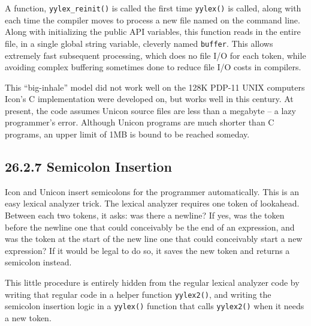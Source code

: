 A function, \texttt{yylex\_reinit()} is called the first time
\texttt{yylex()} is called, along with each time the compiler moves to
process a new file named on the command line. Along with initializing
the public API variables, this function reads in the entire file, in a
single global string variable, cleverly named \texttt{buffer}. This
allows extremely fast subsequent processing, which does no file I/O
for each token, while avoiding complex buffering sometimes done to
reduce file I/O costs in compilers.

This ``big-inhale'' model did not work well on the 128K PDP-11 UNIX
computers Icon's C implementation were developed on, but works well in
this century. At present, the code assumes Unicon source files are
less than a megabyte -- a lazy programmer's error. Although Unicon
programs are much shorter than C programs, an upper limit of 1MB is
bound to be reached someday.



\subsection[26.2.7 Semicolon Insertion]{26.2.7 Semicolon Insertion}

Icon and Unicon insert semicolons for the programmer
automatically. This is an easy lexical analyzer trick. The lexical
analyzer requires one token of lookahead. Between each two tokens, it
asks: was there a newline?  If yes, was the token before the newline
one that could conceivably be the end of an expression, and was the
token at the start of the new line one that could conceivably start a
new expression? If it would be legal to do so, it saves the new token
and returns a semicolon instead.

This little procedure is entirely hidden from the regular lexical
analyzer code by writing that regular code in a helper function
\texttt{yylex2()}, and writing the semicolon insertion logic in a
\texttt{yylex()} function that calls \texttt{yylex2()} when it needs a
new token.

